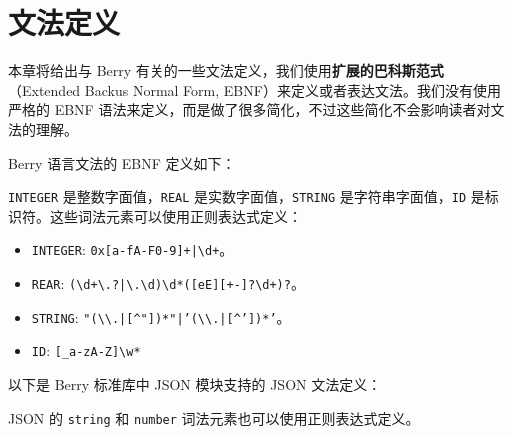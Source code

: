 \chapter{文法定义}

本章将给出与 Berry 有关的一些文法定义，我们使用\textbf{扩展的巴科斯范式}（Extended Backus Normal Form, EBNF）来定义或者表达文法。我们没有使用严格的 EBNF 语法来定义，而是做了很多简化，不过这些简化不会影响读者对文法的理解。

Berry 语言文法的 EBNF 定义如下：



\texttt{INTEGER} 是整数字面值，\texttt{REAL} 是实数字面值，\texttt{STRING} 是字符串字面值，\texttt{ID} 是标识符。这些词法元素可以使用正则表达式定义：

\begin{itemize}
    \item \texttt{INTEGER}: \texttt{0x[a-fA-F0-9]+|\textbackslash d+}。
    \item \texttt{REAR}: \texttt{(\textbackslash d+\textbackslash.?|\textbackslash.\textbackslash d)\textbackslash d*([eE][+-]?\textbackslash d+)?}。
    \item \texttt{STRING}: \texttt{"(\textbackslash\textbackslash.|[\textasciicircum"])*"|'(\textbackslash\textbackslash.|[\textasciicircum'])*'}。
    \item \texttt{ID}: \texttt{[\_a-zA-Z]\textbackslash w*}
\end{itemize}

以下是 Berry 标准库中 JSON 模块支持的 JSON 文法定义：



JSON 的 \texttt{string} 和 \texttt{number} 词法元素也可以使用正则表达式定义。

